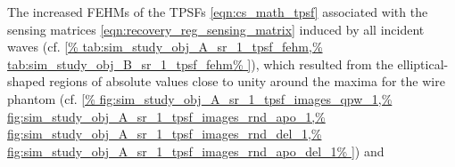 The increased \acp{FEHM} of
the \acp{TPSF}
\eqref{eqn:cs_math_tpsf} associated with
the sensing matrices
\eqref{eqn:recovery_reg_sensing_matrix} induced by
all incident waves
(cf. \cref{%
  tab:sim_study_obj_A_sr_1_tpsf_fehm,%
  tab:sim_study_obj_B_sr_1_tpsf_fehm%
}), which resulted from
the elliptical-shaped regions of
absolute values close to
unity around
the maxima for
the wire phantom
(cf. \cref{%
  fig:sim_study_obj_A_sr_1_tpsf_images_qpw_1,%
  fig:sim_study_obj_A_sr_1_tpsf_images_rnd_apo_1,%
  fig:sim_study_obj_A_sr_1_tpsf_images_rnd_del_1,%
  fig:sim_study_obj_A_sr_1_tpsf_images_rnd_apo_del_1%
}) and
